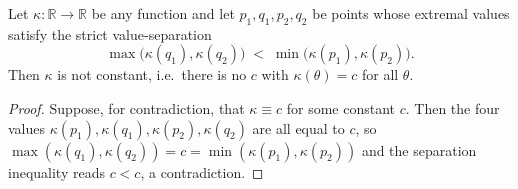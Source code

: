 \begin{lemma}

  \label{lem:not_constant_of_separation}
  Let $\kappa : \mathbb{R} \to \mathbb{R}$ be any function and let
  $p_1, q_1, p_2, q_2$ be points whose extremal values satisfy the strict
  value-separation
  \[
    \max\bigl(\kappa(q_1), \kappa(q_2)\bigr) \;<\; \min\bigl(\kappa(p_1), \kappa(p_2)\bigr).
  \]
  Then $\kappa$ is not constant, i.e.\ there is no $c$ with $\kappa(\theta) = c$
  for all $\theta$.
\end{lemma}
\begin{proof}

\leanok
  Suppose, for contradiction, that $\kappa \equiv c$ for some constant $c$. Then
  the four values $\kappa(p_1), \kappa(q_1), \kappa(p_2), \kappa(q_2)$ are all
  equal to $c$, so $\max(\kappa(q_1), \kappa(q_2)) = c = \min(\kappa(p_1), \kappa(p_2))$
  and the separation inequality reads $c < c$, a contradiction.
\end{proof}

